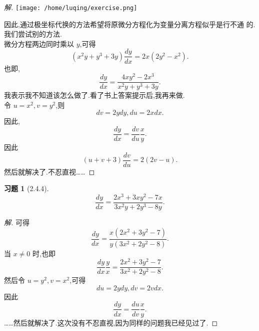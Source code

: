 \documentclass[a4paper, 12pt]{article} %
\newtheorem*{cdtheorem}{习题}
\newenvironment{exercise}
{\bigskip\begin{mdframed}[backgroundcolor=gray!40,rightline=false,leftline=false,topline=false,bottomline=false]\begin{cdtheorem}}
    {\end{cdtheorem}\end{mdframed}\bigskip}
\begin{document}
\begin{CJK}{UTF8}{gkai}
\begin{proof}[解]
\texttt{[image: /home/luqing/exercise.png]}

因此,通过极坐标代换的方法希望将原微分方程化为变量分离方程似乎是行不通
的.我们尝试别的方法.\\

微分方程两边同时乘以 $y$,可得
$$
(x^2y+y^3+3y)\frac{dy}{dx}=2x(2y^2-x^2).
$$
也即,
$$
\frac{dy}{dx}=\frac{4xy^2-2x^3}{x^2y+y^3+3y}.
$$
我表示我不知道该怎么做了.看了书上答案提示后,我再来做.\\

令 $u=x^2,v=y^2$,则
$$
dv=2ydy,du=2xdx.
$$
因此,
$$
\frac{dy}{dx}=\frac{dv}{du}\frac{x}{y}.
$$
因此
$$
(u+v+3)\frac{dv}{du}=2(2v-u).
$$
然后就解决了.不忍直视……
\end{proof}
\begin{exercise}[2.4.4]
$$
\frac{dy}{dx}=\frac{2x^3+3xy^2-7x}{3x^2y+2y^3-8y}.
$$  
\end{exercise}
\begin{proof}[解]
  可得
$$
\frac{dy}{dx}=\frac{x(2x^2+3y^2-7)}{y(3x^2+2y^2-8)}.
$$
当 $x\neq 0$ 时,也即
$$
\frac{dy}{dx}\frac{y}{x}=\frac{2x^2+3y^2-7}{3x^2+2y^2-8}.
$$
然后令 $u=y^2,v=x^2$,可得
$$
du=2ydy,dv=2vdx.
$$
因此
$$
\frac{dy}{dx}=\frac{du}{dv}\frac{x}{y}.
$$
……然后就解决了.这次没有不忍直视,因为同样的问题我已经见过了.
\end{proof}
\end{CJK}
\end{document}
